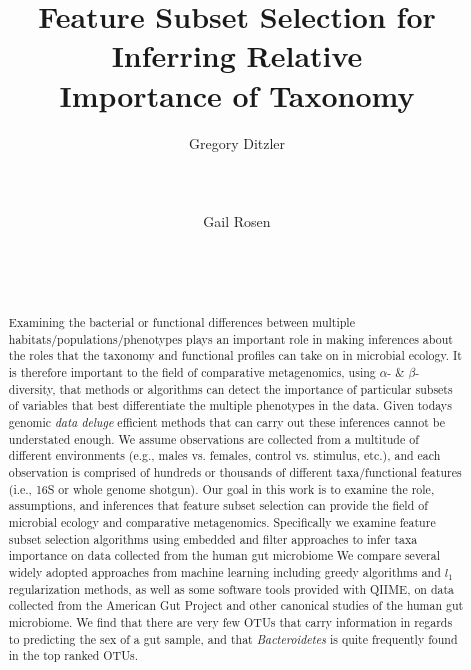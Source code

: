 \documentclass{acm_proc_article-sp}
\begin{document}
\title{Feature Subset Selection for Inferring Relative\\Importance of Taxonomy}

\author{
\alignauthor
Gregory Ditzler\\
       \\
       \\
       \\
\alignauthor 
Gail Rosen\\
       \\
       \\
       \\
}



\maketitle
\begin{abstract}

Examining the bacterial or functional differences between multiple habitats/populations/phenotypes plays an important role in making inferences about the roles that the taxonomy and functional profiles can take on in microbial ecology. It is therefore important to the field of comparative metagenomics, using $\alpha$- \& $\beta$-diversity, that methods or algorithms can detect the importance of particular subsets of variables that best differentiate the multiple phenotypes in the data. Given todays genomic {\em data deluge} efficient methods that can carry out these inferences cannot be understated enough. We assume observations are collected from a multitude of different environments (e.g., males vs. females, control vs. stimulus, etc.), and each observation is comprised of hundreds or thousands of different taxa/functional features (i.e., 16S or whole genome shotgun). Our goal in this work is to examine the role, assumptions, and inferences that feature subset selection can provide the field of microbial ecology and comparative metagenomics. 
Specifically we examine feature subset selection algorithms using embedded and filter approaches to infer taxa importance on data collected from the human gut microbiome 
We compare several widely adopted approaches from machine learning including greedy algorithms and $l_1$ regularization methods, as well as some software tools provided with QIIME, on data collected from the American Gut Project and other canonical studies of the human gut microbiome. 
We find that there are very few OTUs that carry information in regards to predicting the sex of a gut sample, and that {\em Bacteroidetes} is quite frequently found in the top ranked OTUs. 

\end{abstract}
\end{document}
